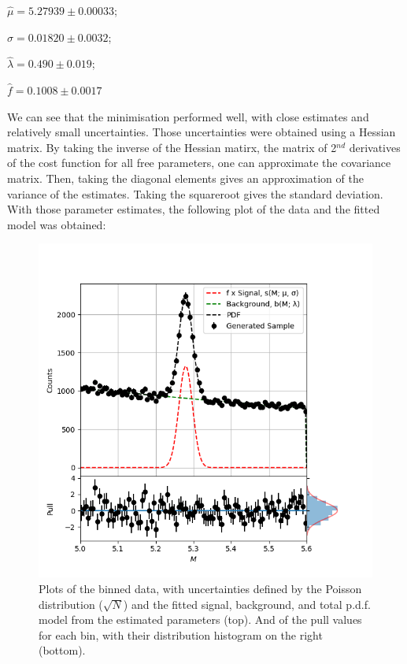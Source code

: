 \documentclass[12pt]{report} %
\begin{document}
\begin{center}
    $\hat{\mu} = 5.27939 \pm 0.00033$;  

    $\hat{\sigma} = 0.01820 \pm 0.0032$;  
    
    $\hat{\lambda} = 0.490 \pm 0.019$;  

    $\hat{f} = 0.1008 \pm 0.0017$
\end{center}

We can see that the minimisation performed well, with close estimates and relatively small uncertainties. Those uncertainties were obtained using a Hessian matrix. By taking the inverse of the Hessian matirx, the matrix of 2$^{nd}$ derivatives of the cost function for all free parameters, one can approximate the covariance matrix. Then, taking the diagonal elements gives an approximation of the variance of the estimates. Taking the squareroot gives the standard deviation. With those parameter estimates, the following plot of the data and the fitted model was obtained:

\begin{figure}[tp]
    \centering
    \includegraphics[width=\textwidth]{../Plots/plot_pdf_e.png}
    \captionsetup{margin=1.3cm}
    \caption[width=0.2\pdfpagewidth]{Plots of the binned data, with uncertainties defined by the Poisson distribution ($\sqrt{N}$) and the fitted signal, background, and total p.d.f. model from the estimated parameters (top). And of the pull values for each bin, with their distribution histogram on the right (bottom).}
\end{figure}
\end{document}
